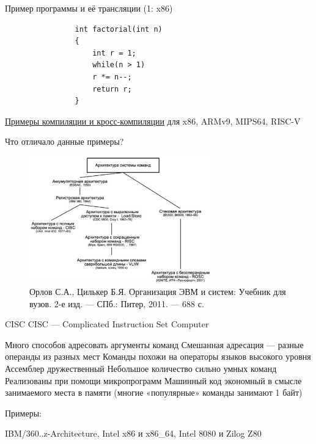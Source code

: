 \documentclass[xetex,aspectratio=43]{beamer}
\begin{document}
\begin{frame}[fragile]{Пример программы и её трансляции (1: x86)}
    \begin{center}
        \begin{minipage}{0.4\linewidth}
            \begin{verbatim}
                int factorial(int n)
                {
                    int r = 1;
                    while(n > 1)
                    r *= n--;
                    return r;
                }
            \end{verbatim}
        \end{minipage}
    \end{center}

\href{https://github.com/dluciv/Computer_Architecture-SPbU-CB.5080/tree/main/examples/cross-compiling}{Примеры компиляции и кросс-компиляции} для x86, ARMv9, MIPS64, RISC-V

\end{frame}

\begin{frame}{Что отличало данные примеры?}
    \begin{figure}
    \includegraphics[width=0.7\textwidth]{img/11.instr_sets.png}
    \caption{Орлов С.А., Цилькер Б.Я. Организация ЭВМ и систем: Учебник для вузов. 2-е изд. — СПб.: Питер, 2011. — 688 с.}
    \end{figure}
\end{frame}

\begin{frame}{CISC}
    CISC — Complicated Instruction Set Computer

    \begin{outline}[itemize]
        \1 Много способов адресовать аргументы команд
        \1 Смешанная адресация — разные операнды из разных мест
        \1 Команды похожи на операторы языков высокого уровня
        \1 Ассемблер дружественный
        \1 Небольшое количество сильно умных команд
        \1 Реализованы при помощи микропрограмм
        \1 Машинный код экономный в смысле занимаемого места в памяти (многие «популярные» команды занимают 1 байт)
    \end{outline}

    Примеры:

    IBM/360..z-Architecture, Intel x86 и x86\_64, Intel 8080 и Zilog Z80
\end{frame}
\end{document}
